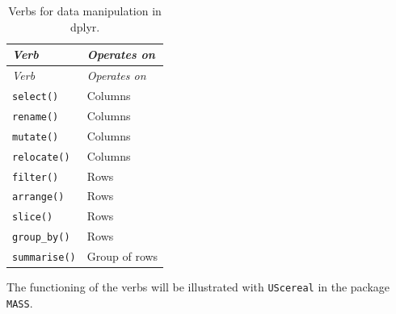 \documentclass[
]{book}
\begin{document}
\begin{longtable}[]{@{}
  >{\raggedright\arraybackslash}p{}
  >{\raggedright\arraybackslash}p{}@{}}
\caption{\label{tab:dplyr} Verbs for data manipulation in dplyr.}\tabularnewline
\toprule\noalign{}
\begin{minipage}[b]{\linewidth}\raggedright
\emph{{Verb}}
\end{minipage} & \begin{minipage}[b]{\linewidth}\raggedright
\emph{{Operates on}}
\end{minipage} \\
\midrule\noalign{}
\endfirsthead
\toprule\noalign{}
\begin{minipage}[b]{\linewidth}\raggedright
\emph{{Verb}}
\end{minipage} & \begin{minipage}[b]{\linewidth}\raggedright
\emph{{Operates on}}
\end{minipage} \\
\midrule\noalign{}
\endhead
\bottomrule\noalign{}
\endlastfoot
\texttt{select()} & Columns \\
\texttt{rename()} & Columns \\
\texttt{mutate()} & Columns \\
\texttt{relocate()} & Columns \\
\texttt{filter()} & Rows \\
\texttt{arrange()} & Rows \\
\texttt{slice()} & Rows \\
\texttt{group\_by()} & Rows \\
\texttt{summarise()} & Group of rows \\
\end{longtable}

The functioning of the verbs will be illustrated with \texttt{UScereal} in the package \texttt{MASS}.
\end{document}
